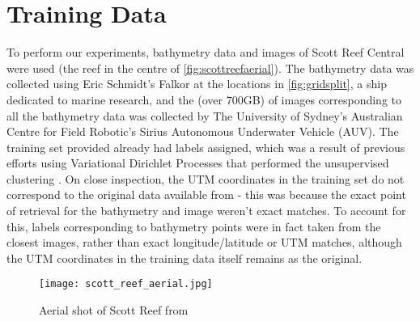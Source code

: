 \section{Training Data}
To perform our experiments, bathymetry data and images of Scott Reef Central were used (the reef in the centre of \autoref{fig:scottreefaerial}). The bathymetry data was collected using Eric Schmidt's Falkor at the locations in \autoref{fig:gridsplit}, a ship dedicated to marine research, and the (over 700GB) of images corresponding to all the bathymetry data was collected by The University of Sydney's Australian Centre for Field Robotic's Sirius Autonomous Underwater Vehicle (AUV). The training set provided already had labels assigned, which was a result of previous efforts using Variational Dirichlet Processes that performed the unsupervised clustering \citep{steinberg11}.  On close inspection, the UTM coordinates in the training set do not correspond to the original data available from \cite{squidle} - this was because the exact point of retrieval for the bathymetry and image weren't exact matches. To account for this, labels corresponding to bathymetry points were in fact taken from the closest images, rather than exact longitude/latitude or UTM matches, although the UTM coordinates in the training data itself remains as the original. 

\begin{figure}
    \texttt{[image: scott\_reef\_aerial.jpg]}
    \caption{Aerial shot of Scott Reef from \cite{NASA:SRI}}
    \label{fig:scottreefaerial}
\end{figure}






